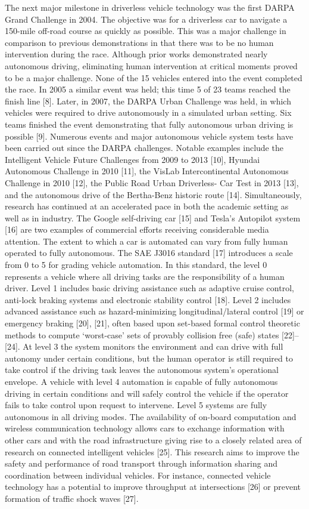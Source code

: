 \documentclass[a4paper,10pt]{article}
\begin{document}
The next major milestone in driverless vehicle technology was the first DARPA Grand Challenge in 2004. The objective was for a driverless car to navigate a 150-mile off-road course as quickly as possible. This was a major challenge in comparison to previous demonstrations in that there was to be no human intervention during the race. Although prior works demonstrated nearly autonomous driving, eliminating human intervention at critical moments proved to be a major challenge. None of the 15 vehicles entered into the event completed the race. In 2005 a similar event was held; this time 5 of 23 teams reached the finish line [8]. Later, in 2007, the DARPA Urban Challenge was held, in which vehicles were required to drive autonomously in a simulated urban setting. Six teams finished the event demonstrating that fully autonomous urban driving is possible [9]. Numerous events and major autonomous vehicle system tests have been carried out since the DARPA challenges. Notable examples include the Intelligent Vehicle Future Challenges from 2009 to 2013 [10], Hyundai Autonomous Challenge in 2010 [11], the VisLab Intercontinental Autonomous Challenge in 2010 [12], the Public Road Urban Driverless- Car Test in 2013 [13], and the autonomous drive of the Bertha-Benz historic route [14]. Simultaneously, research has continued at an accelerated pace in both the academic setting as well as in industry. The Google self-driving car [15] and Tesla’s Autopilot system [16] are two examples of commercial efforts receiving considerable media attention. The extent to which a car is automated can vary from fully human operated to fully autonomous. The SAE J3016 standard [17] introduces a scale from 0 to 5 for grading vehicle automation. In this standard, the level 0 represents a vehicle where all driving tasks are the responsibility of a human driver. Level 1 includes basic driving assistance such as adaptive cruise control, anti-lock braking systems and electronic stability control [18]. Level 2 includes advanced assistance such as hazard-minimizing longitudinal/lateral control [19] or emergency braking [20], [21], often based upon set-based formal control theoretic methods to compute ‘worst-case’ sets of provably collision free (safe) states [22]–[24]. At level 3 the system monitors the environment and can drive with full autonomy under certain conditions, but the human operator is still required to take control if the driving task leaves the autonomous system’s operational envelope. A vehicle with level 4 automation is capable of fully autonomous driving in certain conditions and will safely control the vehicle if the operator fails to take control upon request to intervene. Level 5 systems are fully autonomous in all driving modes. The availability of on-board computation and wireless communication technology allows cars to exchange information with other cars and with the road infrastructure giving rise to a closely related area of research on connected intelligent vehicles [25]. This research aims to improve the safety and performance of road transport through information sharing and coordination between individual vehicles. For instance, connected vehicle technology has a potential to improve throughput at intersections [26] or prevent formation of traffic shock waves [27].
\end{document}
